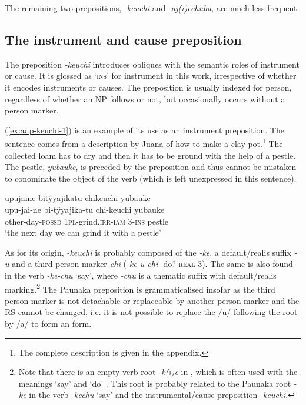 
The remaining two prepositions, \textit{-keuchi} and \textit{-aj(i)echubu}, are much less frequent.

\subsection{The instrument and cause preposition}\label{sec:adp-keuchi}

The preposition \textit{-keuchi} introduces obliques with the semantic roles of instrument or cause. It is glossed as ‘\textsc{ins}’ for instrument in this work, irrespective of whether it encodes instruments or causes. The preposition is usually indexed for person, regardless of whether an NP follows or not, but occasionally occurs without a person marker. 

(\ref{ex:adp-keuchi-1}) is an example of its use as an instrument preposition. The sentence comes from a description by Juana of how to make a clay pot.\footnote{The complete description is given in the appendix.} The collected loam has to dry and then it has to be ground with the help of a pestle. The pestle, \textit{yubauke}, is preceded by the preposition and thus cannot be mistaken to conominate the object of the verb (which is left unexpressed in this sentence).

\ea\label{ex:adp-keuchi-1}
\begingl
\glpreamble upujaine bitÿyajikatu chikeuchi yubauke\\
\gla upu-jai-ne bi-tÿyajika-tu chi-keuchi yubauke\\
\glb other-day-\textsc{possd} 1\textsc{pl}-grind.\textsc{irr}-\textsc{iam} 3-\textsc{ins} pestle\\
\glft ‘the next day we can grind it with a pestle’
\endgl
\trailingcitation{[jmx-d110918ls-2.07]}
\xe

As for its origin, \textit{-keuchi} is probably composed of the  \textit{-ke}, a default/realis suffix \textit{-u} and a third person marker\textit{-chi} (\textit{-ke-u-chi} -do?-\textsc{real}-3). The same  is also found in the verb \textit{-ke-chu} ‘say’, where \textit{-chu} is a thematic suffix with default/realis marking.\footnote{Note that there is an empty verb root \textit{-k(i)e} in , which is often used with the meanings ‘say’ and ‘do’ \citep[221--222]{Danielsen2007}. This root is probably related to the Paunaka root \textit{-ke} in the verb \textit{-kechu} ‘say’ and the instrumental/cause preposition \textit{-keuchi}.} The Paunaka preposition is grammaticalised insofar as the third person marker is not detachable or replaceable by another person marker and the RS cannot be changed, i.e. it is not possible to replace the /u/ following the root by /a/ to form an  form.

